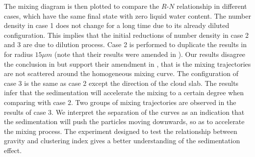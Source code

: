 The mixing diagram is then plotted to compare the $R$-$N$ relationship in
different cases, which have the same final state with zero liquid water
content. The number density in case 1 does not change for a long time due to
its already diluted configuration. This implies that the initial reductions of
number density in case 2 and 3 are due to dilution process. Case 2 is performed
to duplicate the results in \cite{Kumar14} for radius $15\mu m$ (note that
their results were amended in \cite{Kumar16Corr}). Our results disagree the
conclusion in \cite{Kumar14} but support their amendment in \cite{Kumar16Corr},
that is the mixing trajectories are not scattered around the homogeneous mixing
curve. The configuration of case 3 is the same as case 2 except the direction
of the cloud slab. The results infer that the sedimentation will accelerate the
mixing to a certain degree when comparing with case 2. Two groups of mixing
trajectories are observed in the results of case 3. We interpret the separation
of the curves as an indication that the sedimentation will push the particles
moving downwards, so as to accelerate the mixing process. The experiment
designed to test the relationship between gravity and clustering index gives a
better understanding of the sedimentation effect.
